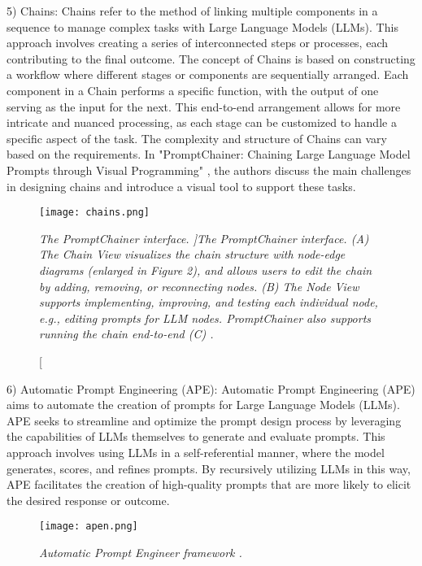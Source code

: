 \hfill

5) Chains: Chains refer to the method of linking multiple components in a sequence to manage complex tasks with Large Language Models (LLMs). This approach involves creating a series of interconnected steps or processes, each contributing to the final outcome. The concept of Chains is based on constructing a workflow where different stages or components are sequentially arranged. Each component in a Chain performs a specific function, with the output of one serving as the input for the next. This end-to-end arrangement allows for more intricate and nuanced processing, as each stage can be customized to handle a specific aspect of the task. The complexity and structure of Chains can vary based on the requirements. In "PromptChainer: Chaining Large Language Model Prompts through Visual Programming" \cite{wu2022promptchainer}, the authors discuss the main challenges in designing chains and introduce a visual tool to support these tasks.

\begin{figure}[H]
    \centering
    \texttt{[image: chains.png]}
    \caption[        \it{The PromptChainer interface.}
    ]{\it{The PromptChainer interface. (A) The Chain View visualizes the chain structure with node-edge diagrams (enlarged
            in Figure 2), and allows users to edit the chain by adding, removing, or reconnecting nodes. (B) The Node View supports implementing, improving, and testing each individual node, e.g., editing prompts for LLM nodes. PromptChainer also supports
            running the chain end-to-end (C) \cite{wu2022promptchainer}.}}
\end{figure}

\hfill

6) Automatic Prompt Engineering (APE): Automatic Prompt Engineering (APE) \cite{zhou2023large} aims to automate the creation of prompts for Large Language Models (LLMs). APE seeks to streamline and optimize the prompt design process by leveraging the capabilities of LLMs themselves to generate and evaluate prompts. This approach involves using LLMs in a self-referential manner, where the model generates, scores, and refines prompts. By recursively utilizing LLMs in this way, APE facilitates the creation of high-quality prompts that are more likely to elicit the desired response or outcome.

\begin{figure}[H]
    \centering
    \texttt{[image: apen.png]}
    \caption{\it{Automatic Prompt Engineer framework \cite{zhou2023large}.}}
\end{figure}

